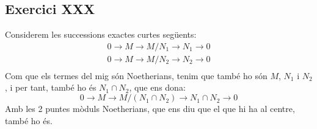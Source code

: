 \documentclass[11pt, a4paper]{article}
\begin{document}
\subsection{Exercici XXX}
Considerem les successions exactes curtes següents:
\begin{align*}
    0\to M\to M/N_1\to N_1\to 0\\
    0\to M\to M/N_2\to N_2\to 0\\
\end{align*}
Com que els termes del mig són Noetherians, tenim que també ho són $M$, $N_1$ i $N_2$, i per tant, també ho és $N_1\cap N_2$, que ens dona:
\[
    0\to M\to M/(N_1\cap N_2)\to N_1\cap N_2\to 0
\]
Amb les 2 puntes mòduls Noetherians, que ens diu que el que hi ha al centre, també ho és.
\end{document}

